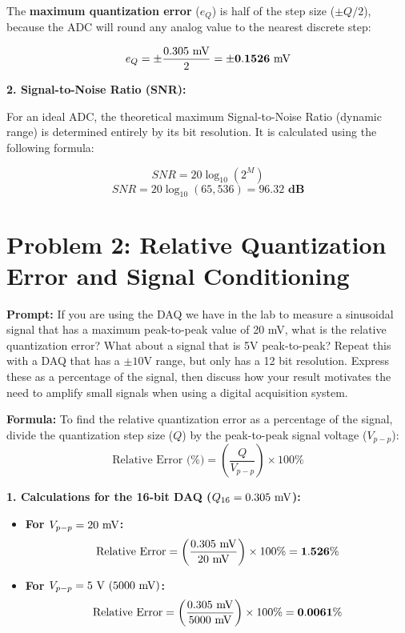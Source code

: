\documentclass[11pt]{article}
\begin{document}
The \textbf{maximum quantization error} ($e_Q$) is half of the step size ($\pm Q/2$), because the ADC will round any analog value to the nearest discrete step:

\[ e_Q = \pm \frac{0.305 \text{ \si{\milli\volt}}}{2} = \mathbf{\pm 0.1526 \text{ \si{\milli\volt}}} \]

\textbf{2. Signal-to-Noise Ratio (SNR):}

For an ideal ADC, the theoretical maximum Signal-to-Noise Ratio (dynamic range) is determined entirely by its bit resolution. It is calculated using the following formula:

\[ SNR = 20 \log_{10}(2^M) \]
\[ SNR = 20 \log_{10}(65,536) = \mathbf{96.32 \text{ dB}} \]

\section*{Problem 2: Relative Quantization Error and Signal Conditioning}

\textbf{Prompt:} If you are using the DAQ we have in the lab to measure a sinusoidal signal that has a maximum peak-to-peak value of 20 mV, what is the relative quantization error? What about a signal that is 5V peak-to-peak? Repeat this with a DAQ that has a $\pm10$V range, but only has a 12 bit resolution. Express these as a percentage of the signal, then discuss how your result motivates the need to amplify small signals when using a digital acquisition system.

\textbf{Formula:}
To find the relative quantization error as a percentage of the signal, divide the quantization step size ($Q$) by the peak-to-peak signal voltage ($V_{p-p}$):
\[ \text{Relative Error (\%)} = \left( \frac{Q}{V_{p-p}} \right) \times 100\% \]

\textbf{1. Calculations for the 16-bit DAQ ($Q_{16} = 0.305 \text{ \si{\milli\volt}}$):}
\begin{itemize}
  \item \textbf{For $V_{p-p} = 20 \text{ \si{\milli\volt}}$:} \\
    \[ \text{Relative Error} = \left( \frac{0.305 \text{ \si{\milli\volt}}}{20 \text{ \si{\milli\volt}}} \right) \times 100\% = \mathbf{1.526\%} \]
  \item \textbf{For $V_{p-p} = 5 \text{ \si{\volt}} \ (5000 \text{ \si{\milli\volt}})$:} \\
    \[ \text{Relative Error} = \left( \frac{0.305 \text{ \si{\milli\volt}}}{5000 \text{ \si{\milli\volt}}} \right) \times 100\% = \mathbf{0.0061\%} \]
\end{itemize}
\end{document}

